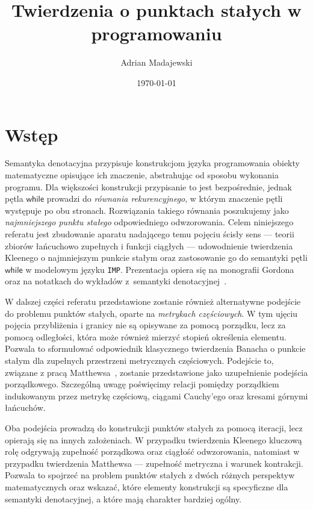 \documentclass[11pt,a4paper]{article}
\title{Twierdzenia o punktach stałych w programowaniu}
\author{Adrian Madajewski}
\date{\today}
\theoremstyle{definition}
\theoremstyle{plain}
\newcommand{\kw}[1]{\ensuremath{\mathsf{#1}}} %
\begin{document}
\maketitle
\tableofcontents
\newpage

\section{Wstęp}

Semantyka denotacyjna przypisuje konstrukcjom języka programowania obiekty matematyczne opisujące ich znaczenie, abstrahując od sposobu wykonania programu. Dla większości konstrukcji przypisanie to jest bezpośrednie, jednak pętla \kw{while} prowadzi do \emph{równania rekurencyjnego}, w którym znaczenie pętli występuje po obu stronach. Rozwiązania takiego równania poszukujemy jako \emph{najmniejszego punktu stałego} odpowiedniego odwzorowania. Celem niniejszego referatu jest zbudowanie aparatu nadającego temu pojęciu ścisły sens --- teorii zbiorów łańcuchowo zupełnych i funkcji ciągłych --- udowodnienie twierdzenia Kleenego o najmniejszym punkcie stałym oraz zastosowanie go do semantyki pętli \kw{while} w modelowym języku \texttt{IMP}. Prezentacja opiera się na monografii Gordona~\cite{gordon1979} oraz na notatkach do wykładów z~semantyki denotacyjnej~\cite{cs152denot,cs4110denot}.

W dalszej części referatu przedstawione zostanie również alternatywne podejście do problemu punktów stałych, oparte na \emph{metrykach częściowych}. W tym ujęciu pojęcia przybliżenia i granicy nie są opisywane za pomocą porządku, lecz za pomocą odległości, która może również mierzyć stopień określenia elementu. Pozwala to sformułować odpowiednik klasycznego twierdzenia Banacha o punkcie stałym dla zupełnych przestrzeni metrycznych częściowych. Podejście to, związane z pracą Matthewsa~\cite{matthews1994}, zostanie przedstawione jako uzupełnienie podejścia porządkowego. Szczególną uwagę poświęcimy relacji pomiędzy porządkiem indukowanym przez metrykę częściową, ciągami Cauchy'ego oraz kresami górnymi łańcuchów.

Oba podejścia prowadzą do konstrukcji punktów stałych za pomocą iteracji, lecz opierają się na innych założeniach. W przypadku twierdzenia Kleenego kluczową rolę odgrywają zupełność porządkowa oraz ciągłość odwzorowania, natomiast w przypadku twierdzenia Matthewsa --- zupełność metryczna i warunek kontrakcji. Pozwala to spojrzeć na problem punktów stałych z dwóch różnych perspektyw matematycznych oraz wskazać, które elementy konstrukcji są specyficzne dla semantyki denotacyjnej, a które mają charakter bardziej ogólny.
\end{document}
